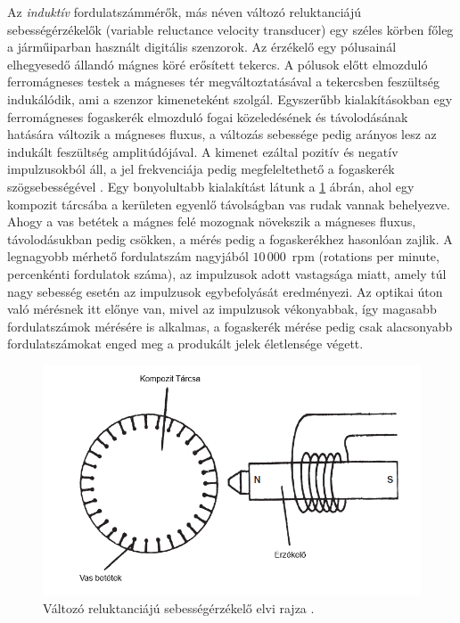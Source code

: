 Az \textit{induktív} fordulatszámmérők, más néven változó reluktanciájú sebességérzékelők (variable reluctance velocity transducer) egy széles körben főleg a járműiparban használt digitális szenzorok. Az érzékelő egy pólusainál elhegyesedő állandó mágnes köré erősített tekercs. A pólusok előtt elmozduló ferromágneses testek a mágneses tér megváltoztatásával a tekercsben feszültség indukálódik, ami a szenzor kimeneteként szolgál. Egyszerűbb kialakításokban egy ferromágneses fogaskerék elmozduló fogai közeledésének és távolodásának hatására változik a mágneses fluxus, a változás sebessége pedig arányos lesz az indukált feszültség amplitúdójával. A kimenet ezáltal pozitív és negatív impulzusokból áll, a jel frekvenciája pedig megfeleltethető a fogaskerék szögsebességével \cite{Morris2016}. Egy bonyolultabb kialakítást látunk a \ref{vrt} ábrán, ahol egy kompozit tárcsába a kerületen egyenlő távolságban vas rudak vannak behelyezve. Ahogy a vas betétek a mágnes felé mozognak növekszik a mágneses fluxus, távolodásukban pedig csökken, a mérés pedig a fogaskerékhez hasonlóan zajlik. A legnagyobb mérhető fordulatszám nagyjából $10\,000$~rpm (rotations per minute, percenkénti fordulatok száma), az impulzusok adott vastagsága miatt, amely túl nagy sebesség esetén az impulzusok egybefolyását eredményezi. Az optikai úton való mérésnek itt előnye van, mivel az impulzusok vékonyabbak, így magasabb fordulatszámok mérésére is alkalmas, a fogaskerék mérése pedig csak alacsonyabb fordulatszámokat enged meg a produkált jelek életlensége végett.
\begin{figure}
	\centering
	\includegraphics[width=\columnwidth*8/10]{figures/vrt.png}
	\caption{Változó reluktanciájú sebességérzékelő elvi rajza \cite{Morris2016b}.}
	\label{vrt}
\end{figure}

